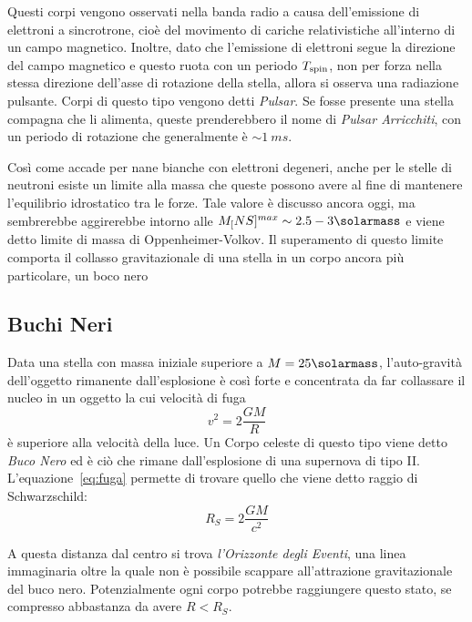 Questi corpi vengono osservati nella banda radio a causa dell'emissione di elettroni a sincrotrone, cioè del movimento di cariche relativistiche all'interno di un campo magnetico. Inoltre, dato che l'emissione di elettroni segue la direzione del campo magnetico e questo ruota con un periodo $T_{\mbox{\scriptsize{spin}}}$, non per forza nella stessa direzione dell'asse di rotazione della stella, allora si osserva una radiazione pulsante. Corpi di questo tipo vengono detti \textit{Pulsar}. Se fosse presente una stella compagna che li alimenta, queste prenderebbero il nome di \textit{Pulsar Arricchiti}, con un periodo di rotazione che generalmente è $\sim \SI{1}{ms}$.

Così come accade per nane bianche con elettroni degeneri, anche per le stelle di neutroni esiste un limite alla massa che queste possono avere al fine di mantenere l'equilibrio idrostatico tra le forze. Tale valore è discusso ancora oggi, ma sembrerebbe aggirerebbe intorno alle $M_[NS]^{max} \sim 2.5 - 3 \si{\solarmass}$ e viene detto limite di massa di Oppenheimer-Volkov. Il superamento di questo limite comporta il collasso gravitazionale di una stella in un corpo ancora più particolare, un boco nero
\subsection{Buchi Neri}\label{black-holes}

Data una stella con massa iniziale superiore a $M = 25\si{\solarmass}$, l'auto-gravità dell'oggetto rimanente dall'esplosione è così forte e concentrata da far collassare il nucleo in un oggetto la cui velocità di fuga
\begin{equation}\label{eq:fuga}
    v^2 = 2 \frac{GM}{R}
\end{equation}
è superiore alla velocità della luce. Un Corpo celeste di questo tipo viene detto \textit{Buco Nero} ed è ciò che rimane dall'esplosione di una supernova di tipo II. L'equazione~\eqref{eq:fuga} permette di trovare quello che viene detto raggio di Schwarzschild:
\begin{equation}\label{eq:schwarzschild}
    R_S = 2 \frac{GM}{c^2}
\end{equation}

A questa distanza dal centro si trova \textit{l'Orizzonte degli Eventi}, una linea immaginaria oltre la quale non è possibile scappare all'attrazione gravitazionale del buco nero. Potenzialmente ogni corpo potrebbe raggiungere questo stato, se compresso abbastanza da avere $R<R_S$.

